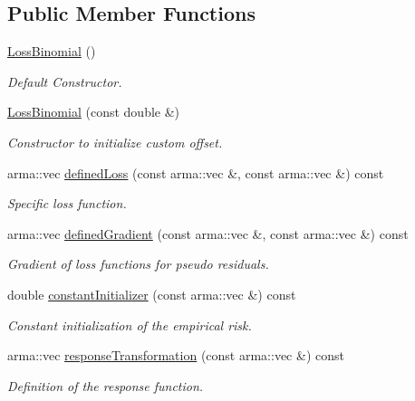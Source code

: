 \subsection*{Public Member Functions}
\begin{DoxyCompactItemize}
\item 
\mbox{\hyperlink{classloss_1_1_loss_binomial_ab1d025ad170fc10db1469cccaf8d877d}{Loss\+Binomial}} ()
\begin{DoxyCompactList}\small\item\em Default Constructor. \end{DoxyCompactList}\item 
\mbox{\hyperlink{classloss_1_1_loss_binomial_a16c4400af5c790a56ac0e0fcb7d1c5c5}{Loss\+Binomial}} (const double \&)
\begin{DoxyCompactList}\small\item\em Constructor to initialize custom offset. \end{DoxyCompactList}\item 
arma\+::vec \mbox{\hyperlink{classloss_1_1_loss_binomial_a396a06f762b735f83af21bdd4ba8fe9c}{defined\+Loss}} (const arma\+::vec \&, const arma\+::vec \&) const
\begin{DoxyCompactList}\small\item\em Specific loss function. \end{DoxyCompactList}\item 
arma\+::vec \mbox{\hyperlink{classloss_1_1_loss_binomial_a68dcf02e90d09c3658733a9319a85f56}{defined\+Gradient}} (const arma\+::vec \&, const arma\+::vec \&) const
\begin{DoxyCompactList}\small\item\em Gradient of loss functions for pseudo residuals. \end{DoxyCompactList}\item 
double \mbox{\hyperlink{classloss_1_1_loss_binomial_a21c384401aa0ef9b2db379e6822c3570}{constant\+Initializer}} (const arma\+::vec \&) const
\begin{DoxyCompactList}\small\item\em Constant initialization of the empirical risk. \end{DoxyCompactList}\item 
arma\+::vec \mbox{\hyperlink{classloss_1_1_loss_binomial_a757fd8d478732ce94e8ba9497846bcf4}{response\+Transformation}} (const arma\+::vec \&) const
\begin{DoxyCompactList}\small\item\em Definition of the response function. \end{DoxyCompactList}\end{DoxyCompactItemize}
